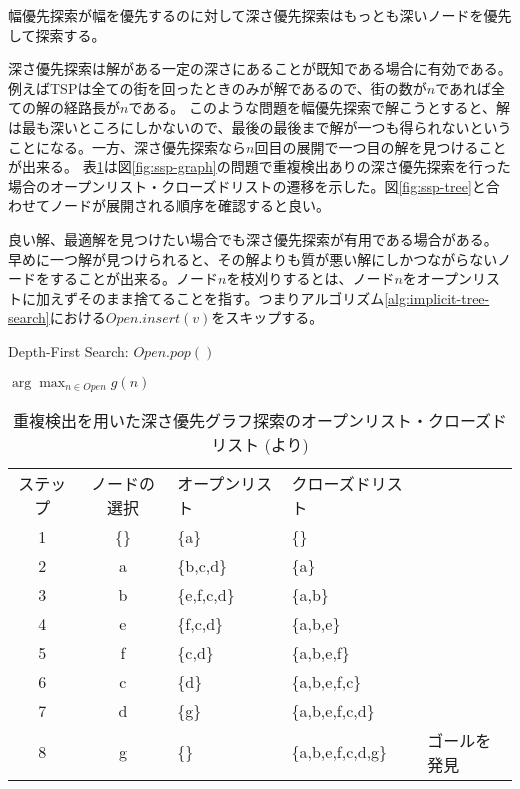 幅優先探索が幅を優先するのに対して深さ優先探索はもっとも深いノードを優先して探索する。

深さ優先探索は解がある一定の深さにあることが既知である場合に有効である。
例えばTSPは全ての街を回ったときのみが解であるので、街の数が$n$であれば全ての解の経路長が$n$である。
このような問題を幅優先探索で解こうとすると、解は最も深いところにしかないので、最後の最後まで解が一つも得られないということになる。一方、深さ優先探索なら$n$回目の展開で一つ目の解を見つけることが出来る。
表\ref{tbl:dfs-traj}は図\ref{fig:ssp-graph}の問題で重複検出ありの深さ優先探索を行った場合のオープンリスト・クローズドリストの遷移を示した。図\ref{fig:ssp-tree}と合わせてノードが展開される順序を確認すると良い。

良い解、最適解を見つけたい場合でも深さ優先探索が有用である場合がある。
早めに一つ解が見つけられると、その解よりも質が悪い解にしかつながらないノードをすることが出来る。ノード$n$を枝刈りするとは、ノード$n$をオープンリストに加えずそのまま捨てることを指す。つまりアルゴリズム\ref{alg:implicit-tree-search}における$Open.insert(v)$をスキップする。%


\begin{algorithm}[tbh]
\caption{Depth-First Search: $Open.pop()$}
\label{alg:dfs-open}
	\Return $\arg \max_{n \in Open} g(n)$
\end{algorithm}

\begin{table}[tbh]
\centering
\caption{重複検出を用いた深さ優先グラフ探索のオープンリスト・クローズドリスト (\cite{edelkamp:2010:hst:1875144}より)}
\begin{tabular}{c|c|l|l|l}
	ステップ & ノードの選択 & オープンリスト   & クローズドリスト & \\
	1 	  & \{\}     & \{a\}       & \{\} \\
	2     & a        & \{b,c,d\}   & \{a\} \\
	3     & b        & \{e,f,c,d\} & \{a,b\} \\
	4     & e        & \{f,c,d\}   & \{a,b,e\} \\
	5     & f        & \{c,d\}     & \{a,b,e,f\} \\
	6     & c        & \{d\}       & \{a,b,e,f,c\} \\
	7     & d        & \{g\}       & \{a,b,e,f,c,d\} \\
	8     & g        & \{\}        & \{a,b,e,f,c,d,g\} & ゴールを発見 \\
\end{tabular}
\label{tbl:dfs-traj}
\end{table}


